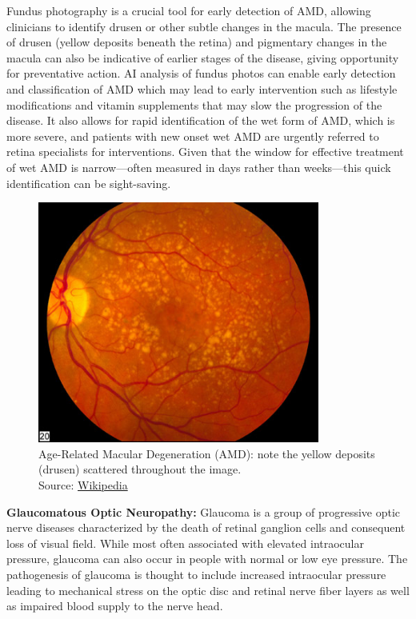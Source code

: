 \documentclass[
  Letterpaper,
]{scrbook}
\begin{document}
Fundus photography is a crucial tool for early detection of AMD,
allowing clinicians to identify drusen or other subtle changes in the
macula. The presence of drusen (yellow deposits beneath the retina) and
pigmentary changes in the macula can also be indicative of earlier
stages of the disease, giving opportunity for preventative action. AI
analysis of fundus photos can enable early detection and classification
of AMD which may lead to early intervention such as lifestyle
modifications and vitamin supplements that may slow the progression of
the disease. It also allows for rapid identification of the wet form of
AMD, which is more severe, and patients with new onset wet AMD are
urgently referred to retina specialists for interventions. Given that
the window for effective treatment of wet AMD is narrow---often measured
in days rather than weeks---this quick identification can be
sight-saving.

\begin{figure}[H]

{\centering \includegraphics[width=3.64583in,height=\textheight,keepaspectratio]{_resources/images/pathologies/Intermediate_age_related_macular_degeneration.jpg}

}

\caption{Age-Related Macular Degeneration (AMD): note the yellow
deposits (drusen) scattered throughout the image.\\
Source:
\href{https://commons.wikimedia.org/wiki/File:Intermediate_age_related_macular_degeneration.jpg}{Wikipedia}}

\end{figure}%

\textbf{Glaucomatous Optic Neuropathy:} Glaucoma is a group of
progressive optic nerve diseases characterized by the death of retinal
ganglion cells and consequent loss of visual field. While most often
associated with elevated intraocular pressure, glaucoma can also occur
in people with normal or low eye pressure. The pathogenesis of glaucoma
is thought to include increased intraocular pressure leading to
mechanical stress on the optic disc and retinal nerve fiber layers as
well as impaired blood supply to the nerve head.
\end{document}
